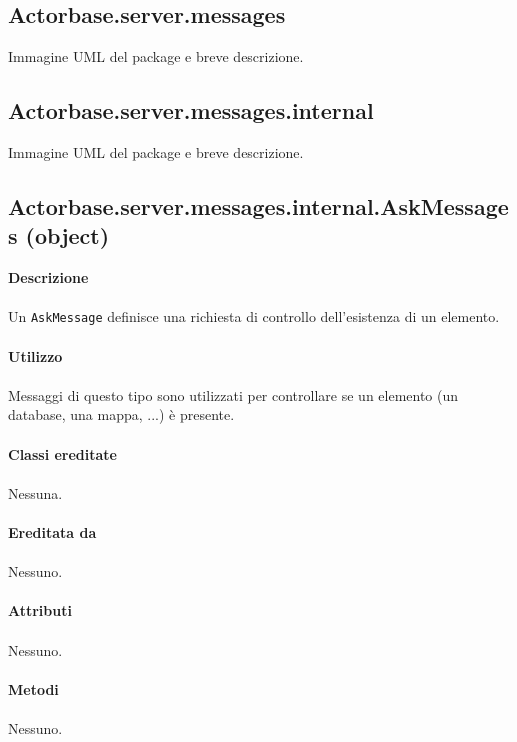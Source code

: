 \documentclass[a4paper]{article}
\begin{document}
	\subsection{Actorbase.server.messages}
		Immagine UML del package e breve descrizione.
		
	\subsection{Actorbase.server.messages.internal}
		Immagine UML del package e breve descrizione.
		
	\subsection{Actorbase.server.messages.internal.AskMessages (object)}
		\textbf{Descrizione}
			\\ \\
			Un \texttt{AskMessage} definisce una richiesta di controllo dell'esistenza di un elemento.
			\\ \\
		\textbf{Utilizzo}
			\\ \\
			Messaggi di questo tipo sono utilizzati per controllare se un elemento (un database, una mappa, ...) è presente.
			\\ \\
		\textbf{Classi ereditate}
			\\ \\
			Nessuna.
			\\ \\
		\textbf{Ereditata da}
			\\ \\
			Nessuno.
			\\ \\
		\textbf{Attributi}
			\\ \\
			Nessuno.
			\\ \\
		\textbf{Metodi}
			\\ \\
			Nessuno.		
		
\end{document}
